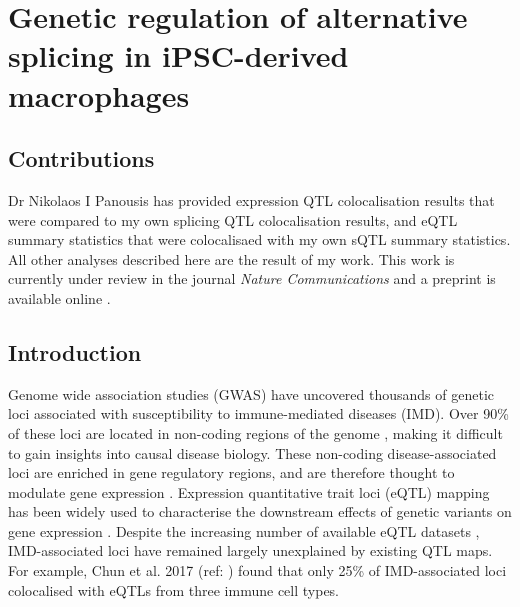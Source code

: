 
\chapter{Genetic regulation of alternative splicing in iPSC-derived macrophages}

\ifpdf
    \graphicspath{{Chapter2/Figs/Raster/}{Chapter2/Figs/PDF/}{Chapter2/Figs/}}
\else
    \graphicspath{{Chapter2/Figs/Vector/}{Chapter2/Figs/}}
\fi
{}
\section{Contributions}
Dr Nikolaos I Panousis has provided expression QTL colocalisation results that were compared to my own splicing QTL colocalisation results, and eQTL summary statistics that were colocalisaed with my own sQTL summary statistics. All other analyses described here are the result of my work. This work is currently under review in the journal \textit{Nature Communications} and a preprint is available online \cite{macromap-sqtl}.

\section{Introduction}
Genome wide association studies (GWAS) have uncovered thousands of genetic loci associated with susceptibility to immune-mediated diseases (IMD). Over 90\% of these loci are located in non-coding regions of the genome \cite{Maurano2012-yw}, making it difficult to gain insights into causal disease biology. These non-coding disease-associated loci are enriched in gene regulatory regions, and are therefore thought to modulate gene expression \cite{Schaub2012-cy}. Expression quantitative trait loci (eQTL) mapping has been widely used to characterise the downstream effects of genetic variants on gene expression \cite{Vosa2021-pb,The_GTEx_Consortium2020-gg}. Despite the increasing number of available eQTL datasets \cite{Kerimov2021-gh}, IMD-associated loci have remained largely unexplained by existing QTL maps. For example, Chun et al. 2017 (ref: \cite{Chun2017-uz}) found that only 25\% of IMD-associated loci colocalised with eQTLs from three immune cell types. \\

